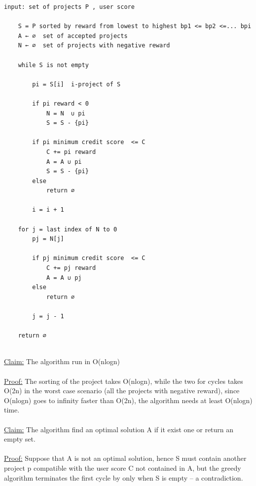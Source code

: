 \documentclass{article}
\begin{document}
 \begin{Verbatim}[fontsize=\small]
	input: set of projects P , user score
	
	S = P sorted by reward from lowest to highest bp1 <= bp2 <=... bpi
	A ← ∅  set of accepted projects
	N ← ∅  set of projects with negative reward 
	
	while S is not empty

		pi = S[i]  i-project of S
		
		if pi reward < 0 
			N = N  ∪ pi
			S = S - {pi}
			
		if pi minimum credit score  <= C
			C += pi reward
			A = A ∪ pi
			S = S - {pi}
		else
			return ∅
		
		i = i + 1
			
	for j = last index of N to 0
		pj = N[j]
		
		if pj minimum credit score  <= C
			C += pj reward
			A = A ∪ pj
		else
			return ∅
		
		j = j - 1
		
	return ∅
			
\end{Verbatim}
\underline{Claim:} The algorithm run in O(nlogn)\\\\\underline{Proof:} The sorting of the project takes O(nlogn), while the two for cycles takes O(2n) in the worst case scenario (all the projects with negative reward), since O(nlogn) goes to infinity faster than O(2n), the algorithm needs at least  O(nlogn) time.\\\\
\underline{Claim:} The algorithm find an optimal solution A if it exist one or return an empty set.\\
\\\underline{Proof:} Suppose that A is not an optimal solution, hence S must contain another project p compatible with the user score C not contained in A, but the greedy algorithm terminates the first cycle by only when S is empty -- a contradiction.

 
\end{document}
